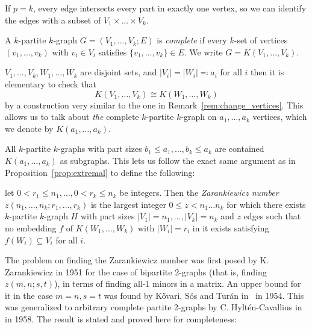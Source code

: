 \begin{remark}
    If $p=k$, every edge intersects every part in exactly one vertex,
    so we can identify the edges with a subset of $ V_1 \times \dots \times V_k$.
\end{remark}

\begin{definition}
    A $k$-partite $k$-graph $G = (V_1, \dots, V_k; E)$ is \emph{complete}
    if every $k$-set of vertices $(v_1, \dots, v_k)$ with $v_i \in V_i$
    satisfies $\{v_1, \dots, v_k\} \in E$.
    We write $G = K(V_1, \dots, V_k)$.
\end{definition}

\begin{remark}
    $V_1, \dots, V_k, W_1, \dots, W_k$ are disjoint sets,
    and $|V_i| = |W_i| \eqqcolon a_i$ for all $i$ then it is elementary to check that
    \[
        K(V_1, \dots, V_k) \cong K(W_1, \dots, W_k)
    \]
    by a construction very similar to the one in Remark~\ref{rem:change_vertices}.
    This allows us to talk about \emph{the} complete $k$-partite $k$-graph on
    $a_1, \dots, a_k$ vertices, which we denote by $K(a_1, \dots, a_k)$.
\end{remark}


\begin{remark}
    All $k$-partite $k$-graphs with part sizes $b_1 \leq a_1, \dots, b_k \leq a_k$
    are contained $K(a_1, \dots, a_k)$ as subgraphs.
    This lets us follow the exact same argument as in Proposition~\ref{prop:extremal}
    to define the following:
\end{remark}

\begin{definition}\label{def:zarankiewicz}
    let $0 < r_1 \leq n_1, \dots, 0 < r_k \leq n_k$ be integers.
    Then the \emph{Zarankiewicz number} $z(n_1, \dots, n_k; r_1, \dots, r_k)$
    is the largest integer $0 \leq z < n_1  \dots n_k$ for which there exists $k$-partite $k$-graph
    $H$ with part sizes $ |V_1| = n_1, \dots, |V_k| = n_k$ and $z$ edges
    such that no embedding $f$ of $K(W_1, \dots, W_k)$ with $|W_i| = r_i$ in it exists
    satisfying $f(W_i) \subseteq V_i$ for all $i$.
\end{definition}

The problem on finding the Zarankiewicz number was first posed by K. Zarankiewicz in 1951 for the
case of bipartite 2-graphs (that is, finding $z(m, n; s, t)$),
in terms of finding all-1 minors in a matrix.
An upper bound for it in the case $m=n, s=t$ was found by Kővari, Sós and Turán in~\cite{Kovari1954} in 1954.
This was generalized to arbitrary complete
partite 2-graphs by C. Hyltén-Cavallius in~\cite{Hylten1958}
in 1958.
The result is stated and proved here for completeness:

